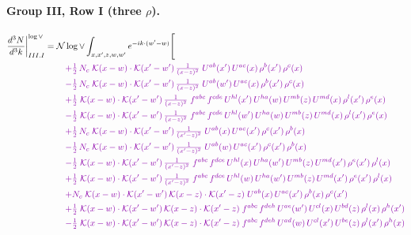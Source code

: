 \documentclass[10pt]{article}
\numberwithin{equation}{section}
\newcommand{\NNv}{\mathcal N\log\vee}
\begin{document}
\paragraph{Group III, Row I (three $\rho$).}
\begin{align}
\frac{d^3N}{d^3k}\bigg|^{\log\vee}_{III.I}={}&\NNv\int_{x,x',z,w,w'}e^{-ik\cdot(w'-w)}\Bigg[\notag\\
&\quad{\color{CC}+\tfrac{1}{2}\,N_c\;\mathcal{K}(x-w)\cdot\mathcal{K}(x'-w')\,\tfrac{1}{(x-z)^{2}}\;U^{ab}(x')\,U^{ac}(x)\,\rho^{b}(x')\,\rho^{c}(x)}\notag\\
&\quad{\color{CC}-\tfrac{1}{2}\,N_c\;\mathcal{K}(x-w)\cdot\mathcal{K}(x'-w')\,\tfrac{1}{(x-z)^{2}}\;U^{ab}(w')\,U^{ac}(x)\,\rho^{b}(x')\,\rho^{c}(x)}\notag\\
&\quad{\color{CC}+\tfrac{1}{2}\;\mathcal{K}(x-w)\cdot\mathcal{K}(x'-w')\,\tfrac{1}{(x-z)^{2}}\;f^{abc}\,f^{cde}\,U^{hl}(x')\,U^{ha}(w)\,U^{mb}(z)\,U^{md}(x)\,\rho^{l}(x')\,\rho^{e}(x)}\notag\\
&\quad{\color{CC}-\tfrac{1}{2}\;\mathcal{K}(x-w)\cdot\mathcal{K}(x'-w')\,\tfrac{1}{(x-z)^{2}}\;f^{abc}\,f^{cde}\,U^{hl}(w')\,U^{ha}(w)\,U^{mb}(z)\,U^{md}(x)\,\rho^{l}(x')\,\rho^{e}(x)}\notag\\
&\quad{\color{CC}+\tfrac{1}{2}\,N_c\;\mathcal{K}(x-w)\cdot\mathcal{K}(x'-w')\,\tfrac{1}{(x'-z)^{2}}\;U^{ab}(x)\,U^{ac}(x')\,\rho^{c}(x')\,\rho^{b}(x)}\notag\\
&\quad{\color{CC}-\tfrac{1}{2}\,N_c\;\mathcal{K}(x-w)\cdot\mathcal{K}(x'-w')\,\tfrac{1}{(x'-z)^{2}}\;U^{ab}(w)\,U^{ac}(x')\,\rho^{c}(x')\,\rho^{b}(x)}\notag\\
&\quad{\color{CC}-\tfrac{1}{2}\;\mathcal{K}(x-w)\cdot\mathcal{K}(x'-w')\,\tfrac{1}{(x'-z)^{2}}\;f^{abc}\,f^{dce}\,U^{hl}(x)\,U^{ha}(w')\,U^{mb}(z)\,U^{md}(x')\,\rho^{e}(x')\,\rho^{l}(x)}\notag\\
&\quad{\color{CC}+\tfrac{1}{2}\;\mathcal{K}(x-w)\cdot\mathcal{K}(x'-w')\,\tfrac{1}{(x'-z)^{2}}\;f^{abc}\,f^{dce}\,U^{hl}(w)\,U^{ha}(w')\,U^{mb}(z)\,U^{md}(x')\,\rho^{e}(x')\,\rho^{l}(x)}\notag\\
&\quad{\color{CC}+N_c\;\mathcal{K}(x-w)\cdot\mathcal{K}(x'-w')\,\mathcal{K}(x-z)\cdot\mathcal{K}(x'-z)\;U^{ab}(x)\,U^{ac}(x')\,\rho^{b}(x)\,\rho^{c}(x')}\notag\\
&\quad{\color{CC}+\tfrac{1}{2}\;\mathcal{K}(x-w)\cdot\mathcal{K}(x'-w')\,\mathcal{K}(x-z)\cdot\mathcal{K}(x'-z)\;f^{abc}\,f^{deh}\,U^{ae}(w')\,U^{cl}(x)\,U^{bd}(z)\,\rho^{l}(x)\,\rho^{h}(x')}\notag\\
&\quad{\color{CC}-\tfrac{1}{2}\;\mathcal{K}(x-w)\cdot\mathcal{K}(x'-w')\,\mathcal{K}(x-z)\cdot\mathcal{K}(x'-z)\;f^{abc}\,f^{deh}\,U^{ad}(w)\,U^{cl}(x')\,U^{be}(z)\,\rho^{l}(x')\,\rho^{h}(x)}\notag\\

\end{align}
\end{document}
